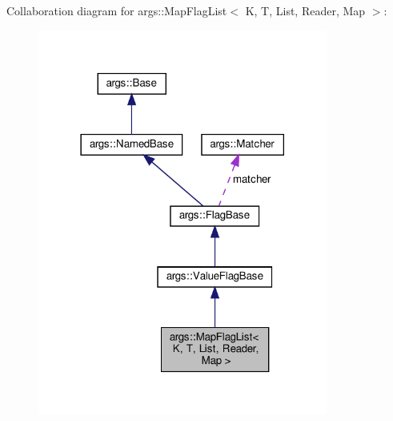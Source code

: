 Collaboration diagram for args\+:\+:Map\+Flag\+List$<$ K, T, List, Reader, Map $>$\+:\nopagebreak
\begin{figure}[H]
\begin{center}
\leavevmode
\includegraphics[width=270pt]{classargs_1_1_map_flag_list__coll__graph}
\end{center}
\end{figure}
